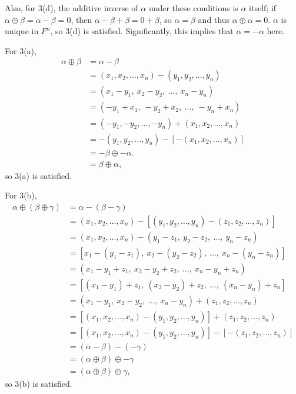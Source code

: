 \documentclass[12pt]{article}
\begin{document}
\begin{enumerate}
    Also, for 3(d), the additive inverse of $\alpha$ under these conditions is
    $\alpha$ itself; if $\alpha \oplus \beta = \alpha - \beta = 0$, then $\alpha -
    \beta + \beta = 0 + \beta$, so $\alpha = \beta$ and thus $\alpha \oplus \alpha =
    0$.  $\alpha$ is unique in $F^{n}$, so 3(d) is satisfied. Significantly, this
    implies that $\alpha = -\alpha$ here.

    For 3(a),
    \begin{align*}
      \alpha \oplus \beta &= \alpha - \beta\\
                          &= (x_1,x_2,\ldots,x_n) - (y_1,y_2,\ldots,y_n)\\
                          &= (x_1-y_1,\ x_2-y_2,\ \ldots,\ x_n-y_n)\\
                          &= (-y_1+x_1,\ -y_2+x_2,\ \ldots,\ -y_n+x_n)\\
                          &= (-y_1,-y_2,\ldots,-y_n) + (x_1,x_2,\ldots,x_n)\\
                          &= -(y_1,y_2,\ldots,y_n) - [-(x_1,x_2,\ldots,x_n)]\\
                          &= -\beta \oplus -\alpha.\\
                          &= \beta \oplus \alpha,
    \end{align*}
    so 3(a) is satisfied.

    For 3(b),
    \begin{align*}
      \alpha \oplus (\beta \oplus \gamma) &= \alpha - (\beta - \gamma)\\
      &= (x_1,x_2,\ldots,x_n) - [(y_1,y_2,\ldots,y_n) - (z_1,z_2,\ldots,z_n)]\\
      &= (x_1,x_2,\ldots,x_n) - (y_1-z_1,\ y_2-z_2,\ \ldots,\ y_n-z_n)\\
      &= [x_1-(y_1-z_1),\ x_2-(y_2-z_2),\ \ldots,\ x_n-(y_n-z_n)]\\
      &= (x_1-y_1+z_1,\ x_2-y_2+z_2,\ \ldots,\ x_n-y_n+z_n)\\
      &= [(x_1-y_1)+z_1,\ (x_2-y_2)+z_2,\ \ldots,\ (x_n-y_n)+z_n]\\
      &= (x_1-y_1,\ x_2-y_2,\ \ldots,\ x_n-y_n) + (z_1,z_2,\ldots,z_n)\\
      &= [(x_1,x_2,\ldots,x_n) - (y_1,y_2,\ldots,y_n)] + (z_1,z_2,\ldots,z_n)\\
      &= [(x_1,x_2,\ldots,x_n) - (y_1,y_2,\ldots,y_n)] - [-(z_1,z_2,\ldots,z_n)]\\
      &= (\alpha - \beta) - (-\gamma)\\
      &= (\alpha \oplus \beta) \oplus -\gamma\\
      &= (\alpha \oplus \beta) \oplus \gamma,
    \end{align*}
    so 3(b) is satisfied.


\end{enumerate}
\end{document}
